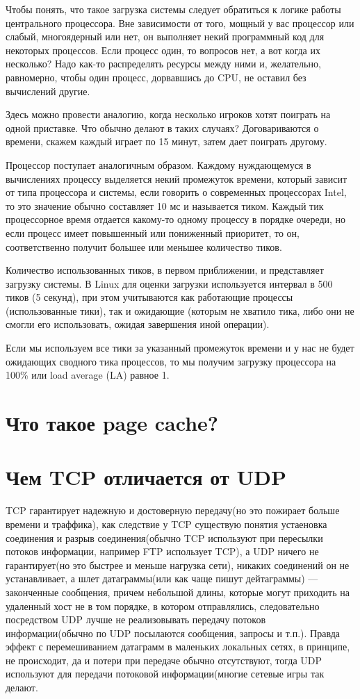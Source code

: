 Чтобы понять, что такое загрузка системы следует обратиться к логике работы центрального процессора. Вне зависимости от того, мощный у вас процессор или слабый, многоядерный или нет, он выполняет некий программный код для некоторых процессов. Если процесс один, то вопросов нет, а вот когда их несколько? Надо как-то распределять ресурсы между ними и, желательно, равномерно, чтобы один процесс, дорвавшись до CPU, не оставил без вычислений другие.

Здесь можно провести аналогию, когда несколько игроков хотят поиграть на одной приставке. Что обычно делают в таких случаях? Договариваются о времени, скажем каждый играет по 15 минут, затем дает поиграть другому.

Процессор поступает аналогичным образом. Каждому нуждающемуся в вычислениях процессу выделяется некий промежуток времени, который зависит от типа процессора и системы, если говорить о современных процессорах Intel, то это значение обычно составляет 10 мс и называется тиком. Каждый тик процессорное время отдается какому-то одному процессу в порядке очереди, но если процесс имеет повышенный или пониженный приоритет, то он, соответственно получит большее или меньшее количество тиков.

Количество использованных тиков, в первом приближении, и представляет загрузку системы. В Linux для оценки загрузки используется интервал в 500 тиков (5 секунд), при этом учитываются как работающие процессы (использованные тики), так и ожидающие (которым не хватило тика, либо они не смогли его использовать, ожидая завершения иной операции).

Если мы используем все тики за указанный промежуток времени и у нас не будет ожидающих сводного тика процессов, то мы получим загрузку процессора на 100\% или load average (LA) равное 1.

\section{Что такое page cache?}

\section{Чем TCP отличается от UDP}

TCP гарантирует надежную и достоверную передачу(но это пожирает больше времени и траффика), как следствие у TCP существую понятия устаеновка соединения и разрыв соединения(обычно TCP используют при пересылки потоков информации, например FTP использует TCP), а UDP ничего не гарантирует(но это быстрее и меньше нагрузка сети), никаких соединений он не устанавливает, а шлет датаграммы(или как чаще пишут дейтаграммы) — законченные сообщения, причем небольшой длины, которые могут приходить на удаленный хост не в том порядке, в котором отправлялись, следовательно посредством UDP лучше не реализовывать передачу потоков информации(обычно по UDP посылаются сообщения, запросы и т.п.). Правда эффект с перемешиванием датаграмм в маленьких локальных сетях, в принципе, не происходит, да и потери при передаче обычно отсутствуют, тогда UDP используют для передачи потоковой информации(многие сетевые игры так делают.

